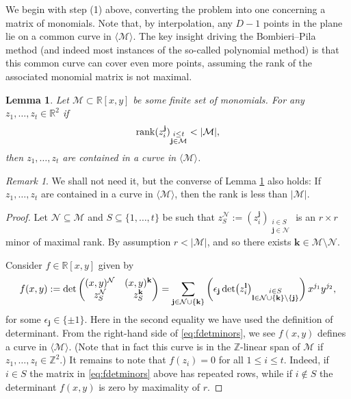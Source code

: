\documentclass[12pt]{amsart}
\newcommand{\1}{{\mathbf 1}}
\newtheorem{lemma}[theorem]{Lemma}
\theoremstyle{remark}
\newtheorem{remark}[theorem]{Remark}
\theoremstyle{definition}
\begin{document}
We begin with step (1) above, converting the problem into one concerning a matrix of monomials. Note that, by interpolation, any $D-1$ points in the plane lie on a common curve in $\langle \mathcal{M}\rangle$. The key insight driving the Bombieri--Pila method (and indeed most instances of the so-called polynomial method) is that this common curve can cover even more points, assuming the rank of the associated monomial matrix is not maximal.
\begin{lemma}\label{lem:rankPij}
Let $\mathcal{M}\subset \mathbb{R}[x,y]$ be some finite set of monomials. For any $z_{1},\ldots, z_{t}\in \mathbb{R}^2$ if
\begin{align*}
\rank(z_i^\mathbf{j})_{\substack{i\le t\\\mathbf{j}\in \mathcal{M}}} < |\mathcal{M}|,
\end{align*}
then $z_1,\ldots,z_t$ are contained in a curve in $\langle \mathcal{M}\rangle$. 
\end{lemma}
\begin{remark}
We shall not need it, but the converse of Lemma \ref{lem:rankPij} also holds: If $z_1,\ldots,z_t$ are contained in a curve in $\langle \mathcal{M}\rangle$, then the rank is less than $|\mathcal{M}|$.
\end{remark}
\begin{proof}
Let $\mathcal N\subseteq \mathcal M$ and $S\subseteq \{1,\ldots,t\}$ be such that $z_S^{\mathcal N}:=(z_i^\mathbf{j})_{\substack{i\in S\\\mathbf{j}\in \mathcal{N}}}$ is an $r\times r$ minor of maximal rank. By assumption $r<|\mathcal{M}|$, and so there exists $\mathbf{k}\in \mathcal{M}\setminus \mathcal{N}$.

Consider $f\in\mathbb{R}[x,y]$ given by 
\begin{align}\label{eq:fdetminors}
f(x,y) := \det\mqty((x,y)^{\mathcal{N}} & (x,y)^{\mathbf{k}} \\ z_S^{\mathcal{N}} & z_S^{\mathbf{k}}) = \sum_{\mathbf{j}\in \mathcal{N}\cup\{\mathbf{k}\}}\left( \epsilon_\mathbf{j}\det(z_{i}^{\mathbf{l}})_{\substack{i\in S\\\mathbf{l}\in \mathcal{N}\cup\{\mathbf{k}\}\setminus\{\mathbf{j}\}}}\right) x^{j_1}y^{j_2},
\end{align}
for some $\epsilon_\mathbf{j}\in\{\pm1\}$. Here in the second equality we have used the definition of determinant. From the right-hand side of \eqref{eq:fdetminors}, we see $f(x,y)$ defines a curve in $\langle \mathcal{M}\rangle$. (Note that in fact this curve is in the $\mathbb{Z}$-linear span of $\mathcal{M}$ if $z_1,\ldots,z_t\in \mathbb{Z}^2$.) It remains to note that $f(z_i)=0$ for all $1\leq i\leq t$. Indeed, if $i\in S$ the matrix in \eqref{eq:fdetminors} above has repeated rows, while if $i\notin S$ the determinant $f(x,y)$ is zero by maximality of $r$.
\end{proof}
\end{document}
